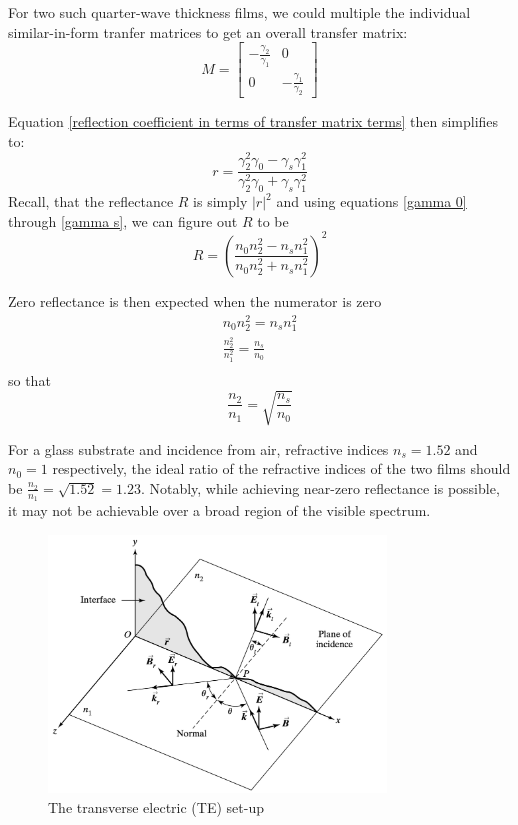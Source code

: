 For two such quarter-wave thickness films, we could multiple the individual similar-in-form tranfer matrices to get an overall transfer matrix:
\[
M = 
    \begin{bmatrix}
    -\frac{\gamma_2}{\gamma_1} & 0 \\
    0 & -\frac{\gamma_1}{\gamma_2}
  \end{bmatrix}
\]

Equation \ref{reflection coefficient in terms of transfer matrix terms} then simplifies to:
\begin{equation}\label{reflection coefficient for 2-layer antireflecting films}
r = \frac{\gamma_2^2\gamma_0 - \gamma_s\gamma_1^2}{\gamma_2^2\gamma_0 + \gamma_s\gamma_1^2}
\end{equation}
Recall, that the reflectance $R$ is simply $|r|^2$ and using equations \ref{gamma 0} through \ref{gamma s}, we can figure out $R$ to be
\begin{equation}\label{reflectance for 2-layer antireflecting films}
R = \left(\frac{n_0n_2^2 - n_sn_1^2}{n_0n_2^2 + n_sn_1^2}\right)^2
\end{equation}

Zero reflectance is then expected when the numerator is zero
\begin{align*}
    n_0n_2^2 = n_sn_1^2 \\
    \frac{n_2^2}{n_1^2} = \frac{n_s}{n_0}  \\
\end{align*} so that
\begin{equation}\label{zero reflectance criterion}
\frac{n_2}{n_1} = \sqrt{\frac{n_s}{n_0}}
\end{equation}

For a glass substrate and incidence from air, refractive indices $n_s = 1.52$ and $n_0 = 1$ respectively, the ideal ratio of the refractive indices of the two films should be $\frac{n_2}{n_1} = \sqrt{1.52} = 1.23$. Notably, while achieving near-zero reflectance is possible, it may not be achievable over a broad region of the visible spectrum.

\begin{figure}
  \centering
  \includegraphics[width=0.8\textwidth]{Chapters/Figures/Incident, Relfected, and Transmitted Ray for TE Mode.png}
  \caption{The transverse electric (TE) set-up}
\end{figure}